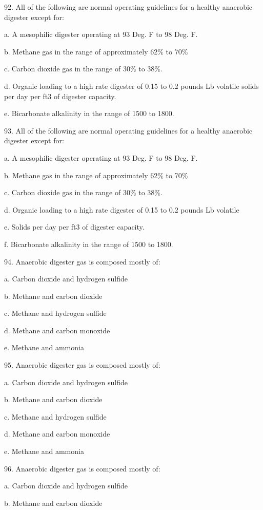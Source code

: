\documentclass{article}
\begin{document}
92. All of the following are normal operating guidelines for a healthy anaerobic digester except for: 

a. A mesophilic digester operating at 93 Deg. F to 98 Deg. F. 

b. Methane gas in the range of approximately 62\% to 70\% 

c. Carbon dioxide gas in the range of 30\% to 38\%. 

d. Organic loading to a high rate digester of 0.15 to 0.2 pounds Lb volatile solids per day per ft3 of digester capacity. 

e. Bicarbonate alkalinity in the range of 1500 to 1800. 


93. All of the following are normal operating guidelines for a healthy anaerobic digester except for: 

a. A mesophilic digester operating at 93 Deg. F to 98 Deg. F. 

b. Methane gas in the range of approximately 62\% to 70\% 

c. Carbon dioxide gas in the range of 30\% to 38\%. 

d. Organic loading to a high rate digester of 0.15 to 0.2 pounds Lb volatile 

e. Solids per day per ft3 of digester capacity. 

f. Bicarbonate alkalinity in the range of 1500 to 1800. 


94. Anaerobic digester gas is composed mostly of: 

a. Carbon dioxide and hydrogen sulfide 

b. Methane and carbon dioxide 

c. Methane and hydrogen sulfide 

d. Methane and carbon monoxide 

e. Methane and ammonia 


95. Anaerobic digester gas is composed mostly of: 

a. Carbon dioxide and hydrogen sulfide 

b. Methane and carbon dioxide 

c. Methane and hydrogen sulfide 

d. Methane and carbon monoxide 

e. Methane and ammonia 


96. Anaerobic digester gas is composed mostly of: 

a. Carbon dioxide and hydrogen sulfide 

b. Methane and carbon dioxide 
\end{document}
